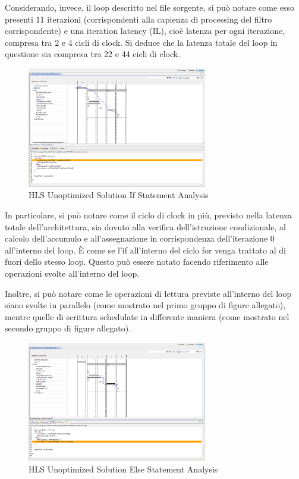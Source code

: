 Considerando, invece, il loop descritto nel file sorgente, si può notare come esso presenti 11 iterazioni (corrispondenti alla capienza di processing del filtro corrispondente) e una iteration latency (IL), cioè latenza per ogni iterazione, compresa tra 2 e 4 cicli di clock. Si deduce che la latenza totale del loop in questione sia compresa tra 22 e 44 cicli di clock.
\begin{figure}[H]
    \centering
    \includegraphics[width=0.7\textwidth]{solutions/unoptimized/cyclesunoptimized.png}
    \caption{HLS Unoptimized Solution If Statement Analysis}
\end{figure}

In particolare, si può notare come il ciclo di clock in più, previsto nella latenza totale dell'architettura, sia dovuto alla verifica dell'istruzione condizionale, al calcolo dell'accumulo e all'assegnazione in corrispondenza dell'iterazione 0 all'interno del loop. È come se l'if all'interno del ciclo for venga trattato al di fuori dello stesso loop. Questo può essere notato facendo riferimento alle operazioni svolte all'interno del loop.

Inoltre, si può notare come le operazioni di lettura previste all'interno del loop siano svolte in parallelo (come mostrato nel primo gruppo di figure allegato), mentre quelle di scrittura schedulate in differente maniera (come mostrato nel secondo gruppo di figure allegato).
\begin{figure}[H]
    \centering
    \includegraphics[width=0.7\textwidth]{solutions/unoptimized/cyclesunoptimized2.png}
    \caption{HLS Unoptimized Solution Else Statement Analysis}
\end{figure}

